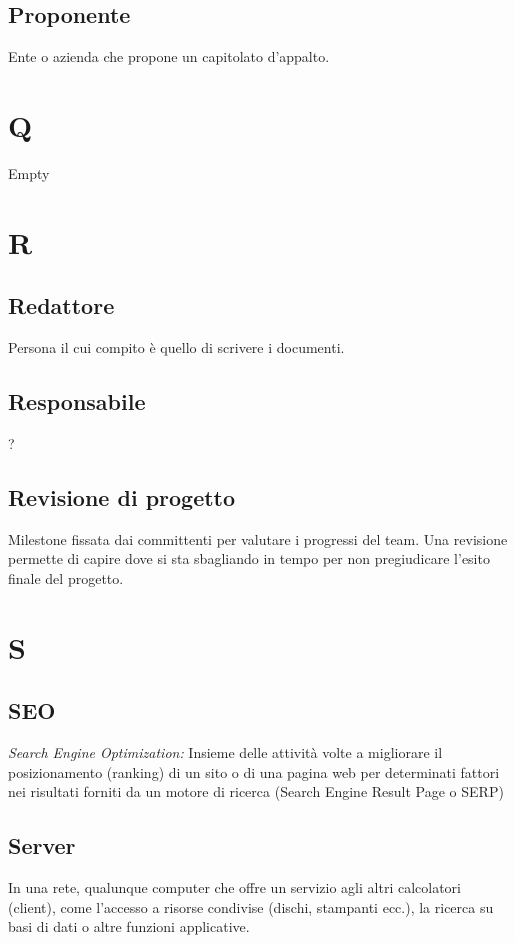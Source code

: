 \subsection*{Proponente}
Ente o azienda che propone un capitolato d'appalto.

\section*{Q}
Empty

\section*{R}
\subsection*{Redattore}
Persona il cui compito è quello di scrivere i documenti.

\subsection*{Responsabile}
?
\subsection*{Revisione di progetto}
Milestone fissata dai committenti per valutare i progressi del team. Una revisione permette di capire dove si sta sbagliando in tempo per non pregiudicare l'esito finale del progetto.

\section*{S}
\subsection*{SEO}
\textit{Search Engine Optimization:} Insieme delle attività volte a migliorare il posizionamento (ranking) di un sito o di una pagina web per determinati fattori nei risultati forniti
da un motore di ricerca (Search Engine Result Page o SERP)

\subsection*{Server}
In una rete, qualunque computer che offre un servizio agli altri calcolatori (client), come l'accesso a risorse condivise (dischi, stampanti ecc.), la ricerca su basi di dati o altre funzioni applicative.

